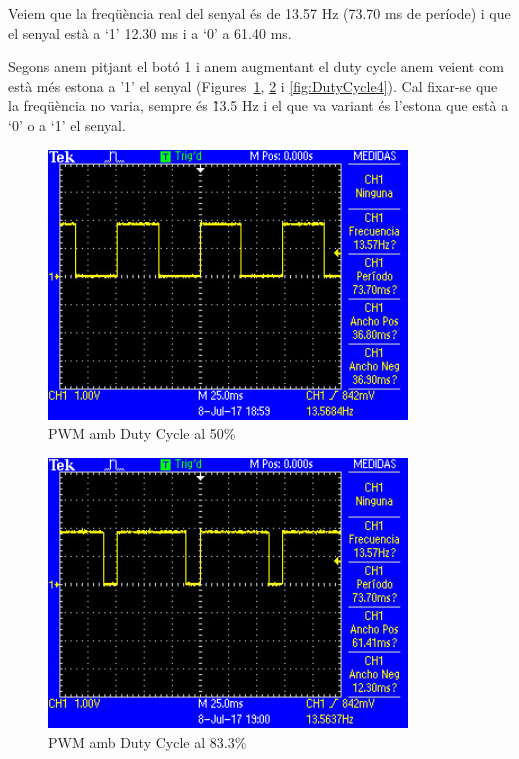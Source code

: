 Veiem que la freqüència real del senyal és de 13.57 Hz (73.70 ms de període) i que el senyal està a ‘1' 12.30 ms i a ‘0' a 61.40 ms.

Segons anem pitjant el botó 1 i anem augmentant el \gls{duty cycle} anem veient com està més estona a '1' el senyal (Figures~\ref{fig:DutyCycle2},
\ref{fig:DutyCycle3} i \ref{fig:DutyCycle4}).
Cal fixar-se que la freqüència no varia, sempre és \~13.5 Hz i el que va variant és l'estona que està a ‘0' o a ‘1' el senyal.

\begin{figure}
 \centering
 \includegraphics[width=0.85\textwidth, keepaspectratio]{imatges/DutyCycle2.png}
 \caption{PWM amb Duty Cycle al 50\%}
 \label{fig:DutyCycle2}
\end{figure}

\begin{figure}
 \centering
 \includegraphics[width=0.85\textwidth, keepaspectratio]{imatges/DutyCycle3.png}
 \caption{PWM amb Duty Cycle al 83.3\%}
 \label{fig:DutyCycle3}
\end{figure}

